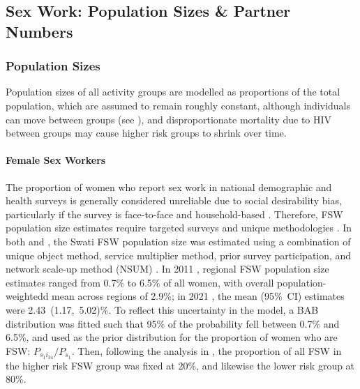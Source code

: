 \subsection{Sex Work: Population Sizes \& Partner Numbers}\label{model.par.sw}
\subsubsection{Population Sizes}\label{model.par.sw.size}
Population sizes of all activity groups are modelled as proportions of the total population,
which are assumed to remain roughly constant,
although individuals can move between groups (see ),
and disproportionate mortality due to HIV between groups
may cause higher risk groups to shrink over time.
\paragraph{Female Sex Workers}
The proportion of women who report sex work in national demographic and health surveys
is generally considered unreliable due to social desirability bias,
particularly if the survey is face-to-face and household-based
\cite{Konings1995,Gregson2002,Gregson2004,Lowndes2012,Behanzin2013}.
Therefore, FSW population size estimates require
targeted surveys and unique methodologies \cite{UNAIDS2010kps,Abdul-Quader2014}.
In both \cite{EswKP2014} and \cite{EswIBBS2022}, the Swati FSW population size
was estimated using a combination of
unique object method, service multiplier method, prior survey participation,
and network scale-up method (NSUM) \cite{UNAIDS2010kps}.
In 2011 \cite{EswKP2014}, regional FSW population size estimates
ranged from 0.7\% to 6.5\% of all women,
with overall population-weightedd mean across regions of 2.9\%;
in 2021 \cite{EswIBBS2022}, the mean (95\%~CI) estimates were 2.43~(1.17,~5.02)\%.
To reflect this uncertainty in the model, a BAB distribution was fitted
such that 95\% of the probability fell between 0.7\% and 6.5\%,
and used as the prior distribution for the proportion of women who are FSW:
$P_{s_{1}i_{34}} / P_{s_{1}}$.
Then, following the analysis in ,
the proportion of all FSW in the higher risk FSW group was fixed at 20\%,
and likewise the lower risk group at 80\%.
